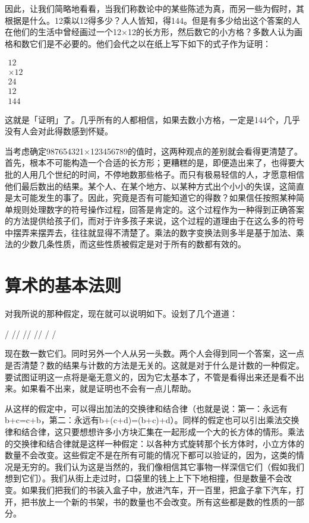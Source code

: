 \documentclass[
  12pt,
  twoside,
  openright,
  oldfontcommands,
]{memoir}
\begin{document}
因此，让我们简略地看看，当我们称数论中的某些陈述为真，而另一些为假时，其根据是什么。12乘以12得多少？人人皆知，得144。但是有多少给出这个答案的人在他们的生活中曾经画过一个12×12的长方形，然后数它的小方格？多数人认为画格和数它们是不必要的。他们会代之以在纸上写下如下的式子作为证明：

\begin{center}

$\begin{array}{r}
  12 \\
  \times 12 \\
  \hline
  24 \\
  12\phantom{0} \\
  \hline
  144
\end{array}$

\end{center}

这就是「证明」了。几乎所有的人都相信，如果去数小方格，一定是144个，几乎没有人会对此得数感到怀疑。

当考虑确定987654321×123456789的值时，这两种观点的差别就会看得更清楚了。首先，根本不可能构造一个合适的长方形；更糟糕的是，即便造出来了，也得要大批的人用几个世纪的时间，不停地数那些格子。而只有极易轻信的人，才愿意相信他们最后数出的结果。某个人、在某个地方、以某种方式出个小小的失误，这简直是太可能发生的事了。因此，究竟是否有可能知道它的得数？如果信任按照某种简单规则处理数字的符号操作过程，回答是肯定的。这个过程作为一种得到正确答案的方法提供给孩子们，而对于许多孩子来说，这个过程的道理由于在这么多的符号中摆弄来摆弄去，往往就显得不清楚了。乘法的数字变换法则多半是基于加法、乘法的少数几条性质，而这些性质被假定是对于所有的数都有效的。

\section{算术的基本法则}

对我所说的那种假定，现在就可以说明如下。设划了几个道道：

/ // // // / /

现在数一数它们。同时另外一个人从另一头数。两个人会得到同一个答案，这一点是否清楚？数的结果与计数的方法是无关的。这就是对于什么是计数的一种假定。要试图证明这一点将是毫无意义的，因为它太基本了，不管是看得出来还是看不出来。如果看不出来，就是证明也不会有一点儿帮助。

从这样的假定中，可以得出加法的交换律和结合律（也就是说：第一：永远有b+c=c+b，第二：永远有b+(c+d)=(b+c)+d）。同样的假定也可以引出乘法交换律和结合律，这只要想想许多小方块汇集在一起形成一个大的长方体的情形。乘法的交换律和结合律就是这样一种假定：以各种方式旋转那个长方体时，小立方体的数量不会改变。这些假定不是在所有可能的情况下都可以验证的，因为，这类的情况是无穷的。我们认为这是当然的，我们像相信其它事物一样深信它们（假如我们想到它们）。我们从街上走过时，口袋里的钱上上下下地相撞，但是数量不会改变。如果我们把我们的书装入盒子中，放进汽车，开一百里，把盒子拿下汽车，打开，把书放上一个新的书架，书的数量也不会改变。所有这些都是数的性质的一部分。
\end{document}
